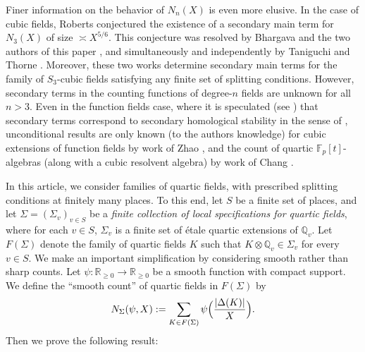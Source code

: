 \documentclass{article}
\def\R{{\mathbb R}}
\def\F{{\mathbb F}}
\def\Q{{\mathbb Q}}
\def\F{{\mathbb F}}
\def\Q{{\mathbb Q}}
\begin{document}
Finer information on the behavior of $N_n(X)$ is even more elusive. In the case of cubic fields, Roberts conjectured the existence of a secondary main term for $N_3(X)$ of size $\asymp X^{5/6}$. This conjecture was resolved by Bhargava and the two authors of this paper \cite{BST}, and simultaneously and independently by Taniguchi and Thorne \cite{MR3127806}. Moreover, these two works determine secondary main terms for the family of $S_3$-cubic fields satisfying any finite set of splitting conditions. However, secondary terms in the counting functions of degree-$n$ fields are unknown for all $n>3$. Even in the function fields case, where it is speculated (see \cite{BDPW}) that secondary terms correspond to secondary homological stability in the sense of \cite{E2_Map_Cl_Gps}, unconditional results are only known (to the authors knowledge) for cubic extensions of function fields by work of Zhao \cite{YZhao_thesis}, and the count of quartic $\F_p[t]$-algebras (along with a cubic resolvent algebra) by work of Chang \cite{KC}.

In this article, we consider families of quartic fields, with prescribed splitting conditions at finitely many places. To this end, let $S$ be a finite set of places, and let $\Sigma=(\Sigma_v)_{v\in S}$ be a {\it finite collection of local specifications for quartic fields}, where for each $v\in S$, $\Sigma_v$ is a finite set of \'etale quartic extensions of $\Q_v$. Let $F(\Sigma)$ denote the family of quartic fields $K$ such that $K\otimes\Q_v\in\Sigma_v$ for every $v\in S$.
We make an important simplification by considering smooth rather than sharp counts. Let $\psi:\R_{\geq 0}\to \R_{\geq 0}$ be a smooth function with compact support. We define the ``smooth count'' of quartic fields in $F(\Sigma)$ by
\begin{equation}\label{eq:fields_count}
N_{\Sigma}(\psi,X):=\sum_{K\in F(\Sigma)}\psi\Bigl(\frac{|\Delta(K)|}{X}\Bigr).
\end{equation}
Then we prove the following result:
\end{document}

